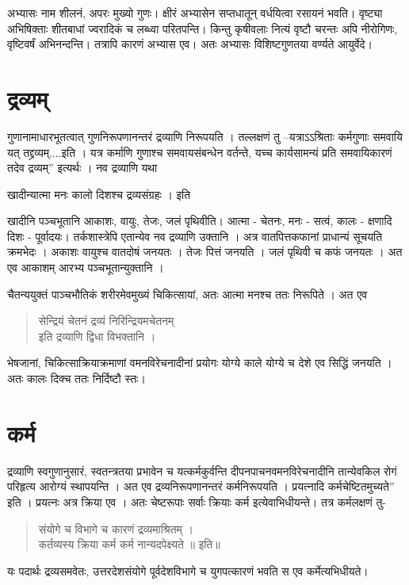 {अभ्यासः नाम शीलनं, अपरः मुख्यो गुणः। क्षीरं अभ्यासेन सप्तधातून् वर्धयित्वा रसायनं भवति। वृष्ट्या अभिषिक्ताः शीतबाधां ज्वरादिकं च लब्ध्वा परितपन्ति। किन्तु कृषीवलाः नित्यं वृष्टौ चरन्तः अपि नीरोगिणः, वृष्टिवर्षं अभिनन्दन्ति। तत्रापि कारणं अभ्यास एव। अतः अभ्यासः विशिष्टगुणतया वर्ण्यते आयुर्वेदे।

\section*{द्रव्यम्}

गुणानामाधारभूतत्वात् गुणनिरूपणानन्तरं द्रव्याणि निरूपयति । तल्लक्षणं तु –यत्राऽऽश्रिताः कर्मगुणाः समवायि यत् तद्द्रव्यम्....इति । यत्र कर्माणि गुणाश्च समवायसंबन्धेन वर्तन्ते, यच्च कार्यसामन्यं प्रति समवायिकारणं तदेव द्रव्यम्” इत्यर्थः । नव द्रव्याणि यथा \

खादीन्यात्मा मनः कालो दिशश्च द्रव्यसंग्रहः । इति


खादीनि पञ्चभूतानि  आकाशः, वायुः, तेजः, जलं पृथिवीति। आत्मा - चेतनः, मनः - सत्वं, कालः - क्षणादि दिशः - पूर्वादयः। तर्कशास्त्रेपि एतान्येव नव द्रव्याणि उक्तानि । अत्र वातपित्तकफानां प्राधान्यं सूचयति क्रमभेदः । अकाशः वायुश्च वातदोषं जनयतः । तेजः पित्तं जनयति । जलं पृथिवी च कफं जनयतः । अत एव आकाशम् आरभ्य पञ्चभूतान्युक्तानि ।

चैतन्ययुक्तं पाञ्चभौतिकं शरीरमेवमुख्यं चिकित्सायां, अतः आत्मा मनश्च ततः निरूपिते । अत एव
\begin{verse}
सेन्द्रियं चेतनं द्रव्यं निरिन्द्रियमचेतनम्\\
इति द्रव्याणि द्विधा विभक्तानि ।
\end{verse}
भेषजानां, चिकित्साक्रियाक्रमाणां वमनविरेचनादीनां प्रयोगः योग्ये काले योग्ये च देशे एव सिद्धिं जनयति । अतः कालः दिक्च ततः निर्दिष्टौ स्तः।

\section*{कर्म} 

द्रव्याणि स्वगुणानुसारं, स्वतन्त्रतया प्रभावेन च यत्कर्मकुर्वन्ति दीपनपाचनवमनविरेचनादीनि तान्येवकिल रोगं परिहृत्य आरोग्यं स्थापयन्ति । अत एव द्रव्यनिरूपणानन्तरं कर्मनिरूपयति । प्रयत्नादि कर्मचेष्टितमुच्यते” इति । प्रयत्नः अत्र क्रिया एव । अतः चेष्टरूपाः सर्वाः क्रियाः कर्म इत्येवाभिधीयन्ते। तत्र कर्मलक्षणं तु-
\begin{verse}
संयोगे च विभागे च कारणं द्रव्यमाश्रितम् ।\\
कर्तव्यस्य क्रिया कर्म कर्म नान्यदपेक्ष्यते ॥ इति॥
\end{verse}
यः पदार्थः द्रव्यसमवेतः, उत्तरदेशसंयोगे पूर्वदेशविभागे च युगपत्कारणं भवति स एव कर्मेत्यभिधीयते।

}
